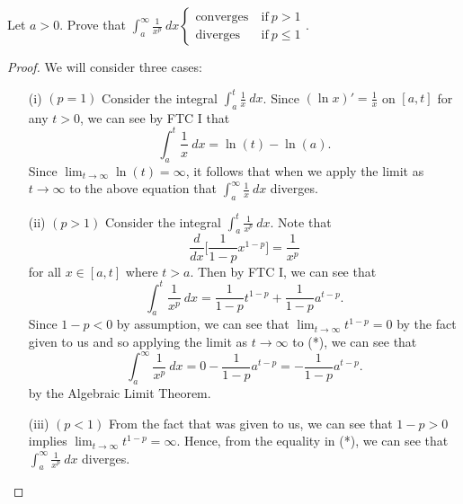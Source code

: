 \documentclass[a4paper]{article}
\begin{document}
\begin{problem}
    Let \( a > 0  \). Prove that \( \displaystyle \int_{ a }^{ \infty  }  \frac{ 1 }{ x^{p} }   \ dx \begin{cases} \text{converges} \ &\text{if}  \ p > 1   \\ \text{diverges} &\text{if} \ p \leq 1   \end{cases} \). 
\end{problem}

\begin{proof}
We will consider three cases:
\begin{enumerate}
    \item[(i)] \( (p = 1) \) Consider the integral \( \int_{ a }^{ t  } \frac{ 1 }{ x }  \ dx \). Since \( (\ln x)' = \frac{ 1 }{ x }  \) on \( [a,t] \) for any \( t > 0  \), we can see by FTC I that 
        \[  \int_{ a }^{ t } \frac{ 1 }{ x }  \ dx = \ln(t) - \ln(a). \]
        Since \( \lim_{ t \to \infty  }  \ln (t) = \infty  \), it follows that when we apply the limit as \( t \to \infty   \) to the above equation that \( \int_{ a }^{ \infty  }  \frac{ 1 }{ x }  \ dx  \) diverges.
    \item[(ii)] \( (p > 1) \) Consider the integral \( \int_{ a }^{ t }  \frac{ 1 }{ x^{p} }  \ dx \). Note that
        \[  \frac{ d }{ dx }  \Big[ \frac{ 1 }{ 1 - p  }  x^{1-p} \Big] = \frac{ 1 }{ x^{p} } \]
        for all \( x \in [a,t] \) where \( t > a  \).
        Then by FTC I, we can see that 
        \[  \int_{ a }^{ t }  \frac{ 1 }{ x^{p} }  \ dx = \frac{ 1 }{ 1 - p  }  t^{1-p} + \frac{ 1 }{ 1 - p  } a^{t-p}. \tag{*} \]
        Since \( 1 - p < 0  \) by assumption, we can see that \( \lim_{ t \to \infty  }  t^{1-p} = 0   \) by the fact given to us and so applying the limit as \( t \to \infty   \) to (*), we can see that 
        \[  \int_{ a }^{ \infty  } \frac{ 1 }{ x^{p} }  \ dx = 0 - \frac{ 1 }{ 1- p  }  a^{t-p} = - \frac{ 1 }{ 1 - p  }  a^{t-p}. \]
        by the Algebraic Limit Theorem.
    \item[(iii)] \( (p < 1) \) From the fact that was given to us, we can see that \( 1 - p > 0  \) implies \( \lim_{ t \to \infty  }  t^{1-p} = \infty  \). Hence, from the equality in (*), we can see that \( \int_{ a }^{ \infty  } \frac{ 1 }{ x^{p} }  \ dx  \) diverges.
\end{enumerate}
\end{proof}
\end{document}
